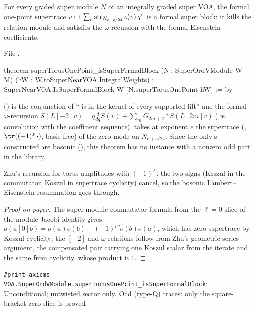 \begin{theorem}\label{l17:thm:formalblock}
For every graded super module $N$ of an integrally graded super VOA, the formal one-point supertrace
$v\mapsto\sum_e\operatorname{str}_{N_{e+c/24}}o(v)\,q^e$ is a formal super block: it kills the relation
module and satisfies the $\omega$-recursion with the formal Eisenstein coefficients.
\end{theorem}
\noindent File .
\begin{leancode}
theorem superTorusOnePoint_isSuperFormalBlock
    (N : SuperOrdVModule W M) (hW : W.toSuperNearVOA.IntegralWeights) :
    SuperNearVOA.IsSuperFormalBlock W (N.superTorusOnePoint hW) := by
\end{leancode}
\begin{dictionary}
 () is the conjunction of
`` is in the kernel of every supported lift'' and the formal $\omega$-recursion
$S(L[-2]v)=q\frac{d}{dq}S(v)+\sum_m G_{2m+2}\ast S(L[2m]v)$ ( is convolution with the
coefficient sequence).  takes at exponent $e$ the supertrace (,
$\tr((-1)^F\cdot)$, basis-free) of the zero mode on $N_{e+c/24}$. Since the only s
constructed are bosonic (), this theorem has no instance with a nonzero odd
part in the library.
\end{dictionary}
\begin{physics}
Zhu's recursion for torus amplitudes with $(-1)^F$: the two signs (Koszul in the commutator, Koszul in
supertrace cyclicity) cancel, so the bosonic Lambert--Eisenstein resummation goes through.
\end{physics}
\begin{proof}[Proof on paper]
The super module commutator formula from the $\ell=0$ slice of the module Jacobi identity gives
$o(a[0]b)=o(a)o(b)-(-1)^{pq}o(b)o(a)$, which has zero supertrace by Koszul cyclicity; the $[-2]$ and
$\omega$ relations follow from Zhu's geometric-series argument, the compensated pair carrying one
Koszul scalar from the iterate and the same from cyclicity, whose product is $1$.
\end{proof}
\begin{status}
\texttt{\#print axioms VOA.SuperOrdVModule.superTorusOnePoint\_isSuperFormalBlock}: . Unconditional; untwisted sector only. Odd (type-Q) traces: only the
square-bracket-zero slice is proved.
\end{status}


